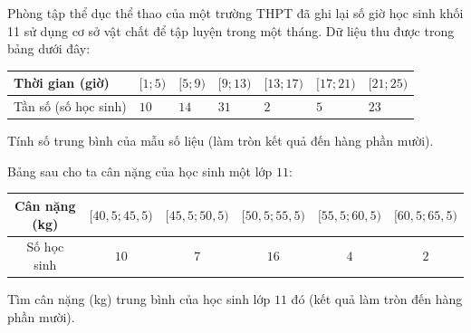\begin{ex}%
	Phòng tập thể dục thể thao của một trường THPT đã ghi lại số giờ học  sinh khối 11 sử dụng cơ sở vật chất để tập luyện trong một tháng. Dữ liệu thu được trong bảng dưới đây:
	\begin{center}
		\begin{tabular}{|>{\centering\arraybackslash}p{4cm}|>{\centering\arraybackslash}p{1.5cm}|>{\centering\arraybackslash}p{1.5cm}|>{\centering\arraybackslash}p{1.5cm}|>{\centering\arraybackslash}p{1.5cm}|>{\centering\arraybackslash}p{1.5cm}|>{\centering\arraybackslash}p{1.5cm}|}
			\hline 
			Thời gian (giờ)&$[1;5)$ & $[5;9)$ & $[9;13)$  &$[13;17)$ & $[17;21)$ &$[21;25)$ \\
			\hline 
			Tần số (số học sinh) &$10$ & $14$ & $31$ &  $2$ & $5$ & $23$ \\
			\hline 
		\end{tabular}
	\end{center}
	Tính số trung bình của mẫu số liệu (làm tròn kết quả đến hàng phần mười). 
\end{ex}

\begin{ex}%
	Bảng sau  cho ta cân nặng của học sinh một lớp $11$:\\
	\begin{center}
		\begin{tabular}{|c|c|c|c|c|c|}
			\hline 
			Cân nặng  (kg)&$[40{,}5;45{,}5)$&$[45{,}5;50{,}5)$&$[50{,}5;55{,}5)$&$[55{,}5;60{,}5)$&$[60{,}5;65{,}5)$\\
			\hline 
			Số học  sinh&$10$&$7$&$16$&$4$&$2$\\
			\hline 
		\end{tabular}
	\end{center}
	Tìm cân nặng (kg) trung bình của học sinh lớp $11$ đó (kết quả làm tròn đến hàng phần mười). 
\end{ex}

